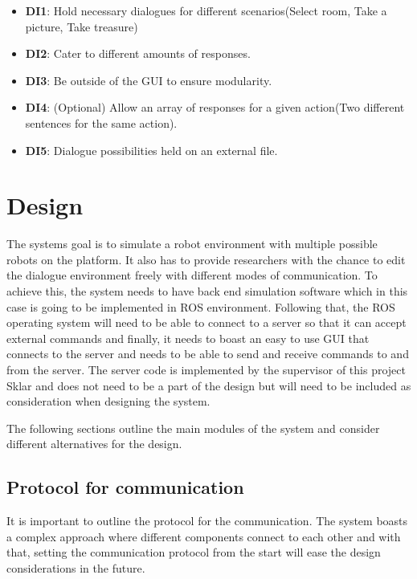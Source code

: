         \begin{itemize}
          \item \textbf{DI1}: Hold necessary dialogues for different scenarios(Select room, Take a picture, Take treasure)
          \item \textbf{DI2}: Cater to different amounts of responses.
          \item \textbf{DI3}: Be outside of the GUI to ensure modularity.
          \item \textbf{DI4}: (Optional) Allow an array of responses for a given action(Two different sentences for the same action).
          \item \textbf{DI5}: Dialogue possibilities held on an external file.
        \end{itemize}

  \chapter{Design}

    The systems goal is to simulate a robot environment with multiple possible robots on the platform. It also has to provide researchers with the chance to edit the dialogue environment freely with different modes of communication. To achieve this, the system needs to have back end simulation software which in this case is going to be implemented in ROS environment. Following that, the ROS operating system will need to be able to connect to a server so that it can accept external commands and finally, it needs to boast an easy to use GUI that connects to the server and needs to be able to send and receive commands to and from the server. The server code is implemented by the supervisor of this project Sklar and does not need to be a part of the design but will need to be included as consideration when designing the system.

    The following sections outline the main modules of the system and consider different alternatives for the design.
    \section{Protocol for communication}
      It is important to outline the protocol for the communication. The system boasts a complex approach where different components connect to each other and with that, setting the communication protocol from the start will ease the design considerations in the future.

